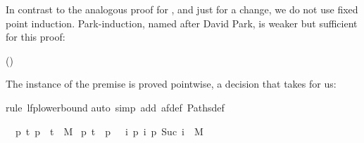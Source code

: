 \begin{isabellebody}
\isadelimproof
%
\endisadelimproof
%
\isatagproof
%
\begin{isamarkuptxt}%
\noindent
In contrast to the analogous proof for , and just
for a change, we do not use fixed point induction.  Park-induction,
named after David Park, is weaker but sufficient for this proof:
\begin{center}
 \hfill ()
\end{center}
The instance of the premise  is proved pointwise,
a decision that  takes for us:%
\end{isamarkuptxt}%
\isamarkuptrue%
\isamarkupfalse%
{}rule\ lfp{}lowerbound{}\isanewline
{}\isamarkupfalse%
{}auto\ simp\ add{}\ af{}def\ Paths{}def{}%
\begin{isamarkuptxt}%
\begin{isabelle}%
\ {}{}\ {}p{}\ {}{}t{}\ {}p\ {}{}\ t{}\ {}\ M\ {}\isanewline
{}p{}\ t\ {}\ p\ {}\ {}\ {}{}i{}\ {}p\ i{}\ p\ {}Suc\ i{}{}\ {}\ M{}\ {}\isanewline

\end{isabelle}
\end{isamarkuptxt}
\end{isabellebody}
